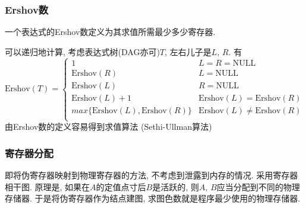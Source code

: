 \documentclass{ctexart}
\begin{document}
\subsubsection{Ershov数} 一个表达式的Ershov数定义为其求值所需最少多少寄存器.\par
    可以递归地计算, 考虑表达式树(DAG亦可)$T$, 左右儿子是$L$, $R$. 有\[
        \text{Ershov}(T) = \begin{cases}
            1 & L = R = \text{NULL}\\
            \text{Ershov}(R) & L = \text{NULL}\\
            \text{Ershov}(L) & R = \text{NULL}\\
            \text{Ershov}(L) + 1 & \text{Ershov}(L) = \text{Ershov}(R)\\
            max\{\text{Ershov}(L), \text{Ershov}(R)\} & \text{Ershov}(L) \neq \text{Ershov}(R)\\
        \end{cases}\]
    由Ershov数的定义容易得到求值算法 (Sethi-Ullman算法)
\subsubsection{寄存器分配}
    即将伪寄存器映射到物理寄存器的方法, 不考虑到泄露到内存的情况.
    采用寄存器相干图. 原理是, 如果在$A$的定值点寸后$B$是活跃的,
    则$A$, $B$应当分配到不同的物理存储器. 于是将伪寄存器作为结点建图,
    求图色数就是程序最少使用的物理存储器.


\end{document}

